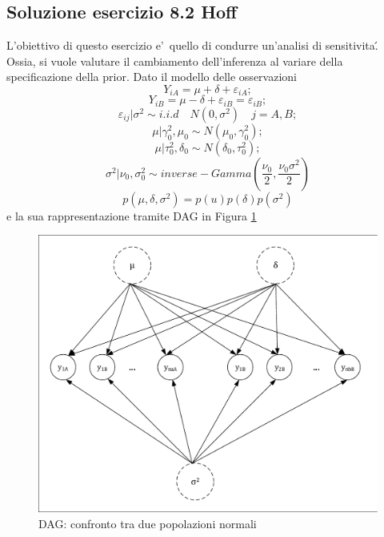 \subsection{Soluzione esercizio 8.2 Hoff}
L'obiettivo di questo esercizio e'\ quello di condurre un'analisi di sensitivita\'. Ossia, si vuole valutare il cambiamento dell'inferenza al variare della specificazione della prior. Dato il modello delle osservazioni 
\[
Y_{iA} = \mu + \delta + \varepsilon_{iA};
\]
\[
Y_{iB} = \mu - \delta + \varepsilon_{iB} = \varepsilon_{iB};
\]
\[
\varepsilon_{ij} | \sigma^2 \sim i.i.d \quad N(0,\sigma^2) \quad j = A,B;
\]
\[
\mu|\gamma_0^2,\mu_0 \sim N(\mu_0,\gamma_0^2);
\]
\[
\mu|\tau_0^2,\delta_0 \sim N(\delta_0,\tau_0^2);
\]
\[
\sigma^2 | \nu_0,\sigma_0^2 \sim inverse-Gamma(\frac{\nu_0}{2},\frac{\nu_0\sigma^2}{2})
\]
\[
p(\mu,\delta,\sigma^2) = p(u)p(\delta)p(\sigma^2)
\]
e la sua rappresentazione tramite DAG in Figura \ref{figure:dag}
\begin{figure}
 \centering
 \includegraphics[scale=0.6]{img/DAG}
 
 \caption{DAG: confronto tra due popolazioni normali}
 \label{figure:dag}
\end{figure}
